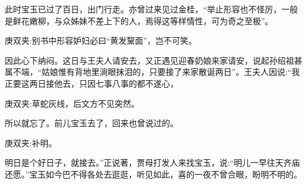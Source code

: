 \begin{parag}
    此时宝玉已过了百日，出门行走。亦曾过来见过金桂，“举止形容也不怪厉，一般是鲜花嫩柳，与众姊妹不差上下的人，焉得这等样情性，可为奇之至极”。\begin{note}庚双夹:别书中形容妒妇必曰“黄发黧面”，岂不可笑。\end{note}因此心下纳闷。这日与王夫人请安去，又正遇见迎春奶娘来家请安，说起孙绍祖甚属不端，“姑娘惟有背地里淌眼抹泪的，只要接了来家散诞两日”。王夫人因说:“我正要这两日接他去，只因七事八事的都不遂心，\begin{note}庚双夹:草蛇灰线，后文方不见突然。\end{note}所以就忘了。前儿宝玉去了，回来也曾说过的。\begin{note}庚双夹:补明。\end{note}明日是个好日子，就接去。”正说著，贾母打发人来找宝玉，说:“明儿一早往天齐庙还愿。”宝玉如今巴不得各处去逛逛，听见如此，喜的一夜不曾合眼，盼明不明的。
\end{parag}


